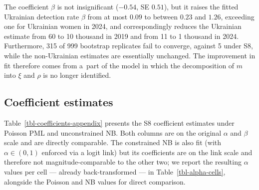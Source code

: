 The coefficient $\beta$ is not insignificant ($-0.54$, SE $0.51$), but it raises the fitted Ukrainian detection rate $\beta$ from at most $0.09$ to between $0.23$ and $1.26$, exceeding one for Ukrainian women in 2024, and correspondingly reduces the Ukrainian estimate from 60 to 10 thousand in 2019 and from 11 to 1 thousand in 2024. Furthermore, 315 of 999 bootstrap replicates fail to converge, against 5 under S8, while the non-Ukrainian estimates are essentially unchanged. The improvement in fit therefore comes from a~part of the model in which the decomposition of $m$ into $\xi$ and $\rho$ is no longer identified. 

\clearpage

\subsection{Coefficient estimates}\label{sec-appendix-coefficients}

Table~\ref{tbl-coefficients-appendix} presents the S8 coefficient
estimates under Poisson PML and unconstrained NB. Both columns are on
the original $\alpha$ and $\beta$ scale and are directly comparable.
The constrained NB is also fit (with $\alpha \in (0,1)$ enforced via a
logit link) but its coefficients are on the link scale and therefore not
magnitude-comparable to the other two; we report the resulting
$\alpha$ values per cell --- already back-transformed --- in
Table~\ref{tbl-alpha-cells}, alongside the Poisson and NB values for
direct comparison.

